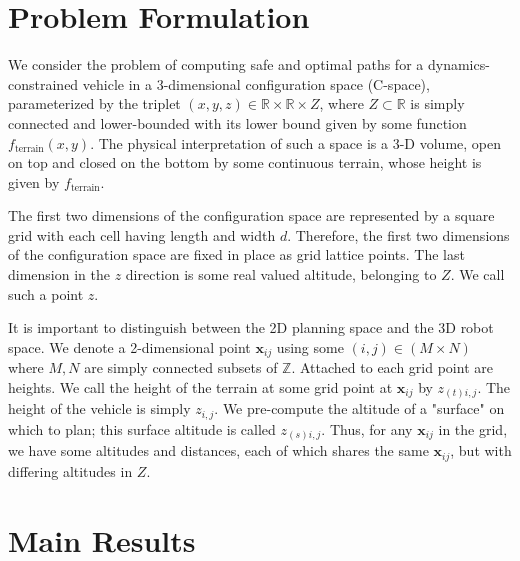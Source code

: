 \documentclass[letterpaper, 12pt]{article}
\def\startmodif{\color{blue}}
\def\stopmodif{\color{black}\normalcolor}
\def\xij{\mathbf{x}_{ij}}
\def\zsij{z_{(s) i,j}}
\def\ztij{z_{(t) i,j}}
\begin{document}
\section{\startmodif Problem Formulation \stopmodif}

We consider the problem of computing safe and optimal paths for a dynamics-constrained vehicle in a 3-dimensional configuration space (C-space), parameterized by the triplet $(x,y,z) \in \mathbb{R}\times \mathbb{R} \times Z$, where $Z \subset \mathbb{R}$ is simply connected and lower-bounded with its lower bound given by some function $f_{\text{terrain}}(x,y)$. The physical interpretation of such a space is a 3-D volume, open on top and closed on the bottom by some continuous terrain, whose height is given by $f_{\text{terrain}}$. 

The first two dimensions of the configuration space are represented by a square grid with each cell having length and width $d$. Therefore, the first two dimensions of the configuration space are fixed in place as grid lattice points. The last dimension in the $z$ direction is some real valued altitude, belonging to $Z$. We call such a point $z$.

It is important to distinguish between the 2D planning space and the 3D robot space. We denote a 2-dimensional point $\xij$ using some $(i,j) \in (M \times N)$ where $M, N$ are simply connected subsets of $\mathbb{Z}$. Attached to each grid point are heights. We call the height of the terrain at some grid point at $\xij$ by $\ztij$. The height of the vehicle is simply $z_{i,j}$. We pre-compute the altitude of a "surface" on which to plan; this surface altitude is called $\zsij$. Thus, for any $\xij$ in the grid, we have some altitudes and distances, each of which shares the same $\xij$, but with differing altitudes in $Z$.
\section{Main Results}
\end{document}
